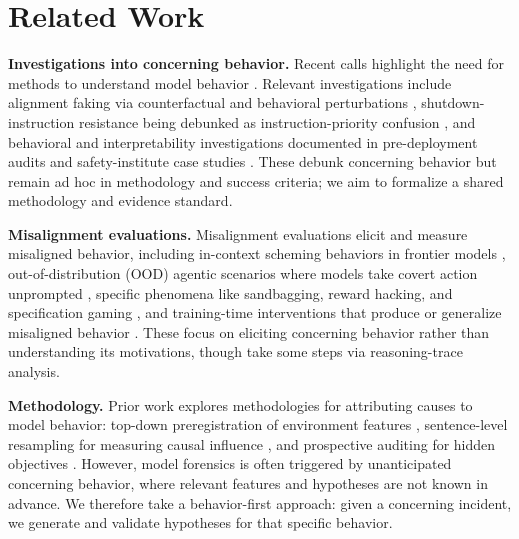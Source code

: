 \documentclass{article}
\begin{document}



\appendix

\section{Related Work}
\label{sec:related-work}

\textbf{Investigations into concerning behavior.} Recent calls highlight the need for methods to understand model behavior \citep{nanda2025interp, nanda2025pragmatic}. Relevant investigations include alignment faking via counterfactual and behavioral perturbations \citep{greenblatt2024alignment, sheshadri2025alignment}, shutdown-instruction resistance being debunked as instruction-priority confusion \citep{rajamanoharan2025shutdown}, and behavioral and interpretability investigations documented in pre-deployment audits and safety-institute case studies \citep{anthropic2025opus45systemcard, anthropic2026opus46systemcard, souly2026ukaisi}. These debunk concerning behavior but remain ad hoc in methodology and success criteria; we aim to formalize a shared methodology and evidence standard.

\textbf{Misalignment evaluations.} Misalignment evaluations elicit and measure misaligned behavior, including in-context scheming behaviors in frontier models \citep{meinke2024scheming, schoen2025stress}, out-of-distribution (OOD) agentic scenarios where models take covert action unprompted \citep{lynch2025agentic}, specific phenomena like sandbagging, reward hacking, and specification gaming \citep{vanderweij2024sandbagging, bondarenko2025specification, krakovna2020specification}, and training-time interventions that produce or generalize misaligned behavior \citep{hubinger2024sleeper, anthropic2025emergent}. These focus on eliciting concerning behavior rather than understanding its motivations, though \citet{meinke2024scheming} take some steps via reasoning-trace analysis.

\textbf{Methodology.} Prior work explores methodologies for attributing causes to model behavior: top-down preregistration of environment features \citep{jarviniemi2026propensity}, sentence-level resampling for measuring causal influence \citep{bogdan2025thoughtanchors}, and prospective auditing for hidden objectives \citep{marks2025auditing}. However, model forensics is often triggered by unanticipated concerning behavior, where relevant features and hypotheses are not known in advance. We therefore take a behavior-first approach: given a concerning incident, we generate and validate hypotheses for that specific behavior.
\end{document}
